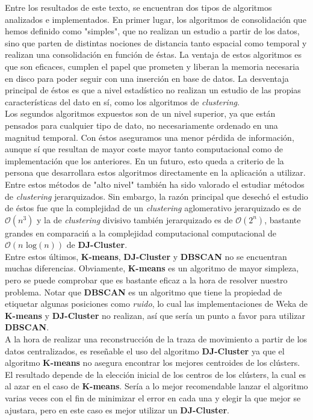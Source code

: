 \documentclass[a4paper, 12pt, spanish]{article}
\begin{document}
Entre los resultados de este texto, se encuentran dos tipos de algoritmos analizados e implementados. En primer lugar, los algoritmos de consolidaci\'on que hemos definido como "simples", que no realizan un estudio a partir de los datos, sino que parten de distintas nociones de distancia tanto espacial como temporal y realizan una consolidaci\'on en funci\'on de \'estas. La ventaja de estos algoritmos es que son eficaces, cumplen el papel que prometen y liberan la memoria necesaria en disco para poder seguir con una inserci\'on en base de datos. La desventaja principal de \'estos es que a nivel estad\'istico no realizan un estudio de las propias caracter\'isticas del dato en s\'i, como los algoritmos de \textit{clustering}.\\

Los segundos algoritmos expuestos son de un nivel superior, ya que est\'an pensados para cualquier tipo de dato, no necesariamente ordenado en una magnitud temporal. Con \'estos aseguramos una menor p\'erdida de informaci\'on, aunque s\'i que resultan de mayor coste mayor tanto computacional como de implementaci\'on que los anteriores. En un futuro, esto queda a criterio de la persona que desarrollara estos algoritmos directamente en la aplicaci\'on a utilizar. \\

Entre estos m\'etodos de "alto nivel" tambi\'en ha sido valorado el estudiar m\'etodos de \textit{clustering} jerarquizados. Sin embargo, la raz\'on principal que desech\'o el estudio de \'estos fue que la complejidad de un \textit{clustering} aglomerativo jerarquizado es de $\mathcal{O}(n^3)$ y la de \textit{clustering} divisivo tambi\'en jerarquizado es de $\mathcal{O}(2^n)$, bastante grandes en comparaci\'n a la complejidad computacional computacional de $\mathcal{O}(n \text{ log}(n))$ de \textbf{DJ-Cluster}.\\

Entre estos \'ultimos, \textbf{K-means}, \textbf{DJ-Cluster} y \textbf{DBSCAN} no se encuentran muchas diferencias. Obviamente, \textbf{K-means} es un algoritmo de mayor simpleza, pero se puede comprobar que es bastante eficaz a la hora de resolver nuestro problema. Notar que \textbf{DBSCAN} es un algoritmo que tiene la propiedad de etiquetar algunas posiciones como \textit{ruido}, lo cual las implementaciones de Weka de \textbf{K-means} y \textbf{DJ-Cluster} no realizan, as\'i que ser\'ia un punto a favor para utilizar \textbf{DBSCAN}.\\

A la hora de realizar una reconstrucci\'on de la traza de movimiento a partir de los datos centralizados, es rese\~nable el uso del algoritmo \textbf{DJ-Cluster} ya que el algoritmo \textbf{K-means} no asegura encontrar los mejores centroides de los cl\'usters. El resultado depende de la elecci\'on inicial de los centros de los cl\'usters, la cual es al azar en el caso de \textbf{K-means}. Ser\'ia a lo mejor recomendable lanzar el algoritmo varias veces con el fin de minimizar el error en cada una y elegir la que mejor se ajustara, pero en este caso es mejor utilizar un \textbf{DJ-Cluster}. \\
\end{document}
